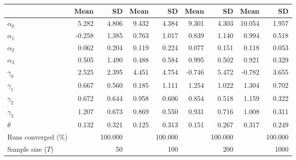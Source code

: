 
\begin{tabular}[t]{lrrrrrrrr}
\toprule
  & Mean & SD & Mean  & SD  & Mean   & SD   & Mean    & SD   \\
\midrule
$\alpha_{0}$ & 5.282 & 4.806 & 9.432 & 4.384 & 9.301 & 4.303 & 10.054 & 1.957\\
$\alpha_{1}$ & -0.258 & 1.385 & 0.763 & 1.017 & 0.839 & 1.140 & 0.994 & 0.518\\
$\alpha_{2}$ & 0.062 & 0.204 & 0.119 & 0.224 & 0.077 & 0.151 & 0.118 & 0.053\\
$\alpha_{3}$ & 0.505 & 1.490 & 0.488 & 0.584 & 0.995 & 0.502 & 0.921 & 0.329\\
$\gamma_{0}$ & 2.525 & 2.395 & 4.451 & 4.754 & -0.746 & 5.472 & -0.782 & 3.655\\
$\gamma_{1}$ & 0.667 & 0.560 & 0.185 & 1.111 & 1.254 & 1.022 & 1.304 & 0.702\\
$\gamma_{2}$ & 0.672 & 0.644 & 0.958 & 0.606 & 0.854 & 0.518 & 1.159 & 0.322\\
$\gamma_{3}$ & 1.207 & 0.673 & 0.869 & 0.550 & 0.931 & 0.716 & 1.008 & 0.311\\
$\theta$ & 0.132 & 0.321 & 0.125 & 0.313 & 0.151 & 0.267 & 0.317 & 0.249\\
Runs converged (\%) &  & 100.000 &  & 100.000 &  & 100.000 &  & 100.000\\
Sample size ($T$) &  & 50 &  & 100 &  & 200 &  & 1000\\
\bottomrule
\end{tabular}
